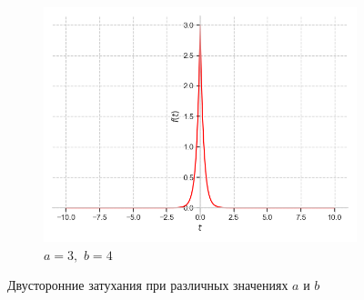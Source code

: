 \documentclass[a4paper, 16pt]{article}
\begin{document}
\begin{figure}[htbp]
\begin{subfigure}{0.3\textwidth}
            \label{fig:doat_2}
        \end{subfigure}
        \hfill
        \begin{subfigure}{0.3\textwidth}
            \centering
            \includegraphics[width=\linewidth]{doat_a=3_b=4.png}
            \caption{$a=3,\,\,b=4$}
            \label{fig:doat_3}
        \end{subfigure}
        \caption{Двусторонние затухания при различных значениях $a$ и $b$}
        \label{fig:doats}
    \end{figure}
\end{document}
